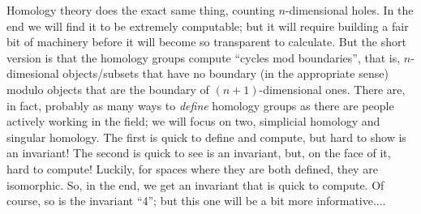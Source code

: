 \msk

Homology theory does the exact same thing, counting $n$-dimensional holes.
In the end we will find it to be extremely computable; but it will require
building a fair bit of machinery before it will become so transparent to
calculate. But the short version is that the homology groups compute
``cycles mod boundaries'', that is, $n$-dimesional objects/subsets that
have no boundary (in the appropriate sense) modulo objects that are the
boundary of $(n+1)$-dimensional ones. There are, in fact, probably as many
ways to {\it define} homology groups as there are people actively working
in the field; we will focus on two, simplicial homology and singular homology.
The first is quick to define and compute, but hard to show is an invariant!
The second is quick to see is an invariant, but, on the face of it, hard
to compute! Luckily, for spaces where they are both defined, they are
isomorphic. So, in the end, we get an invariant that is quick to compute.
Of course, so is the invariant ``4''; but this one will be a bit more
informative....

\msk

